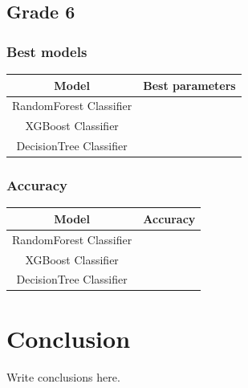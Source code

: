 \documentclass[12pt,a4paper,openright,twoside]{book}
\begin{document}
\newpage
\section{Grade 6}
\subsection{Best models}
\begin{tabular}{|c|c|}
    \hline
    \textbf{Model} & \textbf{Best parameters} \\
    \hline
    RandomForest Classifier  &  \\
    \hline
    XGBoost Classifier & \\
    \hline
    DecisionTree Classifier &  \\
    \hline
\end{tabular}

\subsection{Accuracy}
\begin{tabular}{|c|c|}
    \hline
    \textbf{Model} & \textbf{Accuracy} \\
    \hline
    RandomForest Classifier  &  \\
    \hline
    XGBoost Classifier & \\
    \hline
    DecisionTree Classifier &  \\
    \hline
\end{tabular}
\fi

\chapter{Conclusion}
\label{chap:conclusions}

Write conclusions here.



\backmatter




\end{document}
